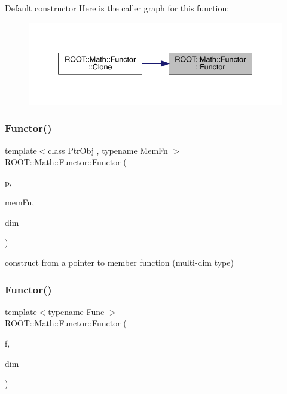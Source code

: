 Default constructor Here is the caller graph for this function\+:\nopagebreak
\begin{figure}[H]
\begin{center}
\leavevmode
\includegraphics[width=338pt]{da/d8e/classROOT_1_1Math_1_1Functor_a2330648eca94b53b3ba613e49d03927f_icgraph}
\end{center}
\end{figure}
\mbox{\label{classROOT_1_1Math_1_1Functor_ad6dbce8351bd8c74e6754215a3ccac41}} 
\subsubsection{\texorpdfstring{Functor()}{Functor()}\hspace{0.1cm}{\footnotesize\ttfamily [2/12]}}
{\footnotesize\ttfamily template$<$class Ptr\+Obj , typename Mem\+Fn $>$ \\
R\+O\+O\+T\+::\+Math\+::\+Functor\+::\+Functor (\begin{DoxyParamCaption}\item[{const Ptr\+Obj \&}]{p,  }\item[{Mem\+Fn}]{mem\+Fn,  }\item[{unsigned int}]{dim }\end{DoxyParamCaption})\hspace{0.3cm}{\ttfamily [inline]}}

construct from a pointer to member function (multi-\/dim type) \mbox{\label{classROOT_1_1Math_1_1Functor_a82af0df828055f18310af5d49dcc3aa2}} 
\subsubsection{\texorpdfstring{Functor()}{Functor()}\hspace{0.1cm}{\footnotesize\ttfamily [3/12]}}
{\footnotesize\ttfamily template$<$typename Func $>$ \\
R\+O\+O\+T\+::\+Math\+::\+Functor\+::\+Functor (\begin{DoxyParamCaption}\item[{const Func \&}]{f,  }\item[{unsigned int}]{dim }\end{DoxyParamCaption})\hspace{0.3cm}{\ttfamily [inline]}}

